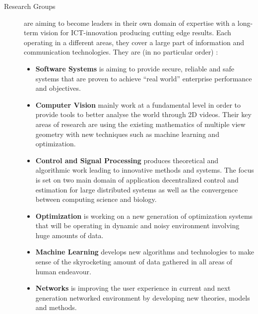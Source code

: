 \documentclass[10pt]{report}
\begin{document}
\begin{description}
\item[Research Groups] are aiming to become leaders in their own domain of expertise with a long-term vision for ICT-innovation producing cutting edge results. Each operating in a different areas, they cover a large part of information and communication technologies. They are (in no particular order) :
\begin{itemize}
\item \textbf{Software Systems} is aiming to provide secure, reliable and safe systems that are proven to achieve \enquote{real world} enterprise performance and objectives. 
\item \textbf{Computer Vision} mainly work at a fundamental level in order to provide tools to better analyse the world through 2D videos. Their key areas of research are using the existing mathematics of multiple view geometry with new techniques such as machine learning and optimization.
\item \textbf{Control and Signal Processing} produces theoretical and algorithmic work leading to innovative methods and systems. The focus is set on two main domain of application decentralized control and estimation for large distributed systems as well as the convergence between computing science and biology.
\item \textbf{Optimization} is working on a new generation of optimization systems that will be operating in dynamic and noisy environment involving huge amounts of data.
\item \textbf{Machine Learning} develops new algorithms and technologies to make sense of the skyrocketing amount of data gathered in all areas of human endeavour. 
\item \textbf{Networks} is improving the user experience in current and next generation networked environment by developing new theories, models and methods.
\end{itemize}


\end{description}
\end{document}
